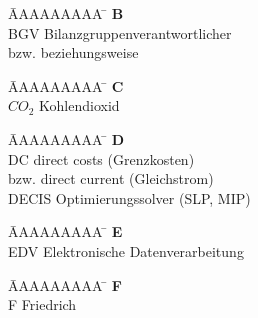 \documentclass[a4paper, fleqn, headsepline, footsepline, 12pt, parskip=half]{scrartcl}
\begin{document}
\vspace*{-1.5cm}
\begin{tabbing}
	\hspace{0.0cm}  \= AAAAAAAAA \=       \hspace{2cm} \kill
	\> \textbf{B} 	\> \\
	\> BGV 			\> Bilanzgruppenverantwortlicher\\
	\> bzw. 		\> beziehungsweise\\
\end{tabbing}

\vspace*{-1.5cm}
\begin{tabbing}
	\hspace{0.0cm}  \= AAAAAAAAA \=       \hspace{2cm} \kill
	\>\textbf{C} 	\> \\
	\> $CO_2$ 		\> Kohlendioxid\\
\end{tabbing} 

\vspace*{-1.5cm}
\begin{tabbing}
	\hspace{0.0cm}  \= AAAAAAAAA \=       \hspace{2cm} \kill
	\> \textbf{D} 	\> \\
	\> DC			\> direct costs (Grenzkosten)\\
	\>      		\> bzw. direct current (Gleichstrom)\\
	\> DECIS\footnotemark \> Optimierungssolver (SLP, MIP)\\
\end{tabbing} 

\vspace*{-1.5cm}
\begin{tabbing}
	\hspace{0.0cm}  \= AAAAAAAAA \=       \hspace{2cm} \kill
	\> \textbf{E} 	\> \\
	\> EDV 			\> Elektronische Datenverarbeitung\\
\end{tabbing} 

\vspace*{-1.5cm}
\begin{tabbing}
	\hspace{0.0cm}  \= AAAAAAAAA \=       \hspace{2cm} \kill
	\>\textbf{F} 	\> \\
	\>F 			\>  Friedrich\\
\end{tabbing} 
\end{document}
